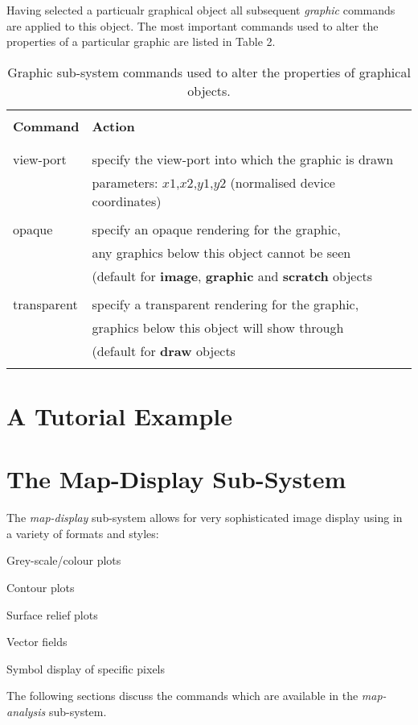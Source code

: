 Having selected a particualr graphical object all subsequent {\em graphic}
commands are applied to this object.  The most important commands used
to alter the properties of a particular graphic are listed in Table 2.
\begin{table}
\begin{tabular}{|l||l|}
\hline
& \\
{\bf Command} & {\bf Action} \\
& \\ \hline
& \\
view-port & specify the view-port into which the graphic is drawn \\
& parameters: $x1$,$x2$,$y1$,$y2$ (normalised device coordinates) \\
& \\
opaque &  specify an opaque rendering for the graphic, \\
& any graphics below this object cannot be seen \\
& (default for {\bf image}, {\bf graphic} and {\bf scratch} objects \\ 
& \\
transparent & specify a transparent rendering for the graphic, \\
& graphics below this object will show through \\
& (default for {\bf draw} objects \\
& \\ \hline
\end{tabular}
\caption{Graphic sub-system commands used to alter the properties of
graphical objects.}
\end{table}

\section{A Tutorial Example}

\section{The Map-Display Sub-System}

The {\em map-display} sub-system allows for very sophisticated 
image display using in a variety of formats and styles:
\begin{npars}
\item Grey-scale/colour plots
\item Contour plots
\item Surface relief plots
\item Vector fields
\item Symbol display of specific pixels
\end{npars}
The following sections discuss the commands which are available in the
{\em map-analysis} sub-system.

